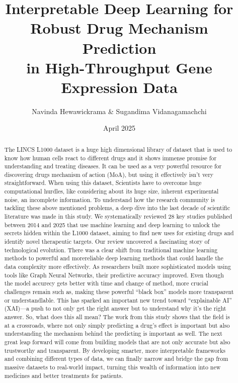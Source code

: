 \documentclass[twocolumn]{article}
\title{Interpretable Deep Learning for Robust Drug Mechanism Prediction \\ in High-Throughput Gene Expression Data}
\author{Navinda Hewawickrama \& Sugandima Vidanagamachchi}
\date{April 2025}
\begin{document}
\onecolumn
\maketitle
\begin{abstract}
        The LINCS L1000 dataset is a huge high dimensional library of dataset that is used to know how human cells react to different drugs and it shows immense promise for understanding and treating diseases. It can be used as a very powerful resource for discovering drugs mechanism of action (MoA), but using it effectively isn't very straightforward. When using this dataset, Scientists have to overcome huge computational hurdles, like considering about its huge size, inherent experimental noise, an incomplete information. To understand how the research community is tackling these above mentioned problems, a deep dive into the last decade of scientific literature was made in this study. We systematically reviewed 28 key studies published between 2014 and 2025 that use machine learning and deep learning to unlock the secrets hidden within the L1000 dataset, aiming to find new uses for existing drugs and identify novel therapeutic targets. Our review uncovered a fascinating story of technological evolution. There was a clear shift from traditional machine learning methods to powerful and morereliable deep learning methods that could handle the data complexity more effectively. As researchers built more sophisticated models using tools like Graph Neural Networks, their predictive accuracy improved. Even though the model accurecy gets better with time and change of method, more crucial challenges remain such as, making these powerful \enquote{black box} models more transparent or understandlable. This has sparked an important new trend toward \enquote{explainable AI} (XAI)—a push to not only get the right answer but to understand why it's the right answer. So, what does this all mean? The work from this study shows that the field is at a crossroads, where not only simply predicting a drug's effect is important but also understanding the mechanism behind the predicting is important as well. The next great leap forward will come from building models that are not only accurate but also trustworthy and transparent. By developing smarter, more interpretable frameworks and combining different types of data, we can finally narrow and bridge the gap from massive datasets to real-world impact, turning this wealth of information into new medicines and better treatments for patients.
\end{abstract}
\end{document}
